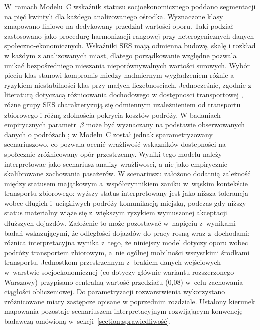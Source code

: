 \documentclass{pracamgr}
\begin{document}
W~ramach \mbox{Modelu~C} wskaźnik statusu socjoekonomicznego poddano segmentacji na pięć kwintyli dla każdego analizowanego ośrodka. Wyznaczone klasy zmapowano liniowo na dedykowany przedział wartości oporu. Taki podział zastosowano jako procedurę harmonizacji rangowej przy heterogenicznych danych społeczno-ekonomicznych. Wskaźniki SES mają odmienna budowę, skalę i rozkład w każdym z analizowanych miast, dlatego porządkowanie względne pozwala unikać bezpośredniego mieszania nieporównywalnych wartości surowych. Wybór pieciu klas stanowi kompromis miedzy nadmiernym wygładzeniem różnic a ryzykiem niestabilności klas przy małych liczebnosciach. Jednocześnie, zgodnie z literaturą dotyczacą różnicowania dochodowego w dostępnosci transportowej \cite{lorenz, capetown}, różne grupy SES charakteryzują się odmiennym uzależnieniem od transportu zbiorowego i różną zdolnościa pokrycia kosztów podróży. W badaniach empirycznych parametr~$\beta$ może być wyznaczany na podstawie obserwowanych danych o podróżach \cite{gravity, gravity2, capetown}; w \mbox{Modelu~C} został jednak sparametryzowany scenariuszowo, co pozwala ocenić wrażliwość wskazników dostepności na społecznie zróżnicowany opór przestrzenny. Wyniki tego modelu należy interpretowac jako scenariusz analizy wrażliwosci, a nie jako empirycznie skalibrowane zachowania pasażerów. W scenariuszu założono dodatnią zależność między statusem majątkowym a~współczynnikiem zaniku w~wąskim kontekście transportu zbiorowego: wyższy status interpretowany jest jako niższa tolerancja wobec długich i~uciążliwych podróży komunikacją miejską, podczas gdy niższy status materialny wiąże się z~większym ryzykiem wymuszonej akceptacji dłuższych dojazdów. Założenie to może pozostawać w~napięciu z~wynikami badań wskazującymi, że odległości dojazdów do pracy rosną wraz z~dochodami; różnica interpretacyjna wynika z~tego, że niniejszy model dotyczy oporu wobec podróży transportem zbiorowym, a~nie ogólnej mobilności wszystkimi środkami transportu. Jednostkom przestrzennym z~brakiem danych wejściowych w~warstwie socjoekonomicznej (co dotyczy głównie wariantu rozszerzonego Warszawy) przypisano centralną wartość przedziału (0{,}08) w~celu zachowania ciągłości obliczeniowej. Do parametryzacji rozwarstwienia wykorzystano zróżnicowane miary zastępcze opisane w poprzednim rozdziale. Ustalony kierunek mapowania pozostaje scenariuszem interpretacyjnym rozwijającym konwencję badawczą omówioną w~sekcji~\ref{section:sprawiedliwość}.
\end{document}
